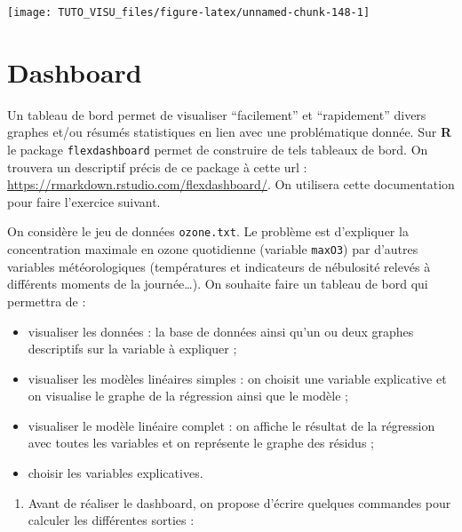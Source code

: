\documentclass[]{book}
\providecommand{\tightlist}{%
  \setlength{\itemsep}{0pt}\setlength{\parskip}{0pt}}
\theoremstyle{definition}
\theoremstyle{definition}
\theoremstyle{definition}
\theoremstyle{remark}
\let\BeginKnitrBlock\begin \let\EndKnitrBlock\end
\begin{document}
\begin{center}\texttt{[image: TUTO\_VISU\_files/figure-latex/unnamed-chunk-148-1]} \end{center}

\hypertarget{dashboard}{%
\section{Dashboard}\label{dashboard}}

Un tableau de bord permet de visualiser ``facilement'' et ``rapidement'' divers graphes et/ou résumés statistiques en lien avec une problématique donnée. Sur \textbf{R} le package \texttt{flexdashboard} permet de construire de tels tableaux de bord. On trouvera un descriptif précis de ce package à cette url : \url{https://rmarkdown.rstudio.com/flexdashboard/}. On utilisera cette documentation pour faire l'exercice suivant.

\BeginKnitrBlock{exercise}[Dashboard pour modèles linéaires]
\protect\hypertarget{exr:dash-ozone}{}{\label{exr:dash-ozone} \iffalse (Dashboard pour modèles linéaires) \fi{} }
\EndKnitrBlock{exercise}

On considère le jeu de données \texttt{ozone.txt}. Le problème est d'expliquer la concentration maximale en ozone quotidienne (variable \texttt{maxO3}) par d'autres variables météorologiques (températures et indicateurs de nébulosité relevés à différents moments de la journée\ldots{}). On souhaite faire un tableau de bord qui permettra de :

\begin{itemize}
\tightlist
\item
  visualiser les données : la base de données ainsi qu'un ou deux graphes descriptifs sur la variable à expliquer ;
\item
  visualiser les modèles linéaires simples : on choisit une variable explicative et on visualise le graphe de la régression ainsi que le modèle ;
\item
  visualiser le modèle linéaire complet : on affiche le résultat de la régression avec toutes les variables et on représente le graphe des résidus ;
\item
  choisir les variables explicatives.
\end{itemize}

\begin{enumerate}
\def\labelenumi{\arabic{enumi}.}
\tightlist
\item
  Avant de réaliser le dashboard, on propose d'écrire quelques commandes pour calculer les différentes sorties :
\end{enumerate}
\end{document}
